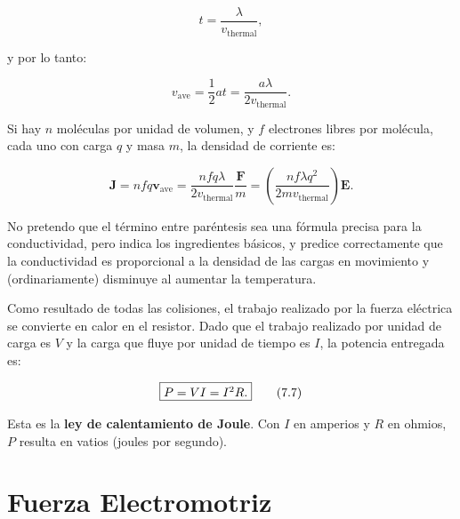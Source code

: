 \documentclass[12pt,a4paper]{report}
\newcommand{\esp}{\vspace{0.5cm}}
\begin{document}
	\esp
	
	\begin{equation}
		t = \frac{\lambda}{v_{\text{thermal}}},
	\end{equation}
	
	\esp
	
	y por lo tanto:
	
	\esp
	
	\begin{equation}
		v_{\text{ave}} = \frac{1}{2} at = \frac{a\lambda}{2v_{\text{thermal}}}.
	\end{equation}
	
	\esp
	
	Si hay $n$ moléculas por unidad de volumen, y $f$ electrones libres por molécula, cada uno con carga $q$ y masa $m$, la densidad de corriente es:
	
	\esp
	
	\begin{equation}
		\mathbf{J} = n f q \mathbf{v}_{\text{ave}} = \frac{n f q \lambda}{2v_{\text{thermal}}} \frac{\mathbf{F}}{m} = \left( \frac{n f \lambda q^2}{2 m v_{\text{thermal}}} \right) \mathbf{E}. \tag{7.6}
	\end{equation}
	
	\esp
	
	No pretendo que el término entre paréntesis sea una fórmula precisa para la conductividad, pero indica los ingredientes básicos, y predice correctamente que la conductividad es proporcional a la densidad de las cargas en movimiento y (ordinariamente) disminuye al aumentar la temperatura.
	
	\esp
	
	Como resultado de todas las colisiones, el trabajo realizado por la fuerza eléctrica se convierte en calor en el resistor. Dado que el trabajo realizado por unidad de carga es $V$ y la carga que fluye por unidad de tiempo es $I$, la potencia entregada es:
	
	\esp
	
	\begin{equation}
		\fbox{$P = VI = I^2 R.$} \tag{7.7}
	\end{equation}
	
	\esp
	
	Esta es la \textbf{ley de calentamiento de Joule}. Con $I$ en amperios y $R$ en ohmios, $P$ resulta en vatios (joules por segundo).
	
	\section{Fuerza Electromotriz}
	
\end{document}
